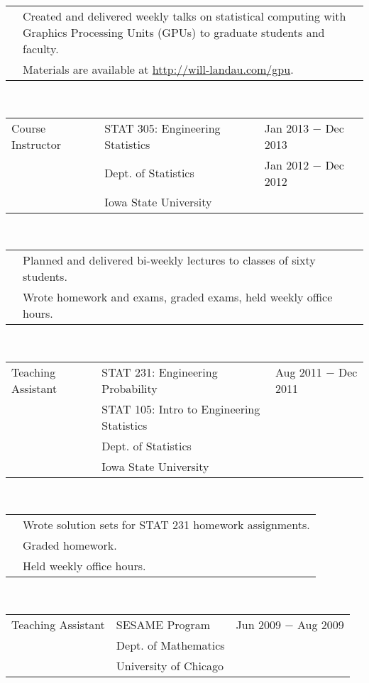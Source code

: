 \documentclass{article}
\newcommand{\q}{$\quad$ \newline}
\newcommand{\vl}{4.25}
\newcommand{\wl}{8.4}
\newcommand{\ww}{13}
\begin{document}
 \noindent \begin{tabular}{@{}p{\vl cm}p{\ww cm}@{}}
& Created and delivered weekly talks on statistical computing with Graphics Processing Units (GPUs) to graduate students and faculty. \\
& Materials are available at \href{http://will-landau.com/gpu}{http://will-landau.com/gpu}.
\end{tabular} \q \q  


\noindent \begin{tabular}{@{}p{\vl cm}p{\wl cm}l@{}}
Course Instructor & STAT 305: Engineering Statistics & Jan 2013 $-$ Dec 2013 \\
& Dept. of Statistics & Jan 2012 $-$ Dec 2012 \\
& Iowa State University & 
\end{tabular} \q \q

\noindent \begin{tabular}{@{}p{\vl cm}p{\ww cm}@{}}
& Planned and delivered bi-weekly lectures to classes of sixty students. \\
& Wrote homework and exams, graded exams, held weekly office hours. \\
\end{tabular} \q \q  

\noindent \begin{tabular}{@{}p{\vl cm}p{\wl cm}l@{}}
Teaching Assistant & STAT 231: Engineering Probability & Aug 2011 $-$ Dec 2011 \\
& STAT 105: Intro to Engineering Statistics & \\
& Dept. of Statistics & \\
& Iowa State University & \\
\end{tabular} \q \q

\noindent \begin{tabular}{@{}p{\vl cm}p{\ww cm}@{}}
& Wrote solution sets for STAT 231 homework assignments. \\
& Graded homework. \\
& Held weekly office hours.
\end{tabular} \q \q  

\noindent \begin{tabular}{@{}p{\vl cm}p{\wl cm}l@{}}
Teaching Assistant & SESAME Program & Jun 2009 $-$ Aug 2009 \\
& Dept. of Mathematics & \\
& University of Chicago &
\end{tabular} \q \q
\end{document}
